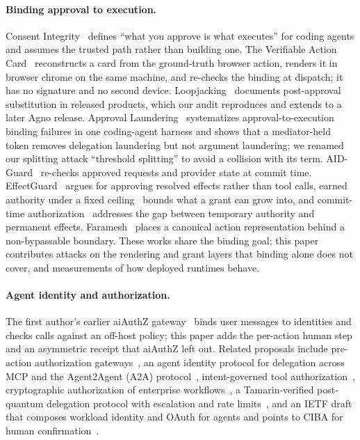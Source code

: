 \paragraph{Binding approval to execution.} Consent Integrity~\citep{weng2026consent} defines ``what you approve is
what executes'' for coding agents and assumes the trusted path rather than building one. The Verifiable Action
Card~\citep{irshad2026vac} reconstructs a card from the ground-truth browser action, renders it in browser chrome on
the same machine, and re-checks the binding at dispatch; it has no signature and no second device.
Loopjacking~\citep{arunkumar2026loopjacking} documents post-approval substitution in released products, which our
audit reproduces and extends to a later Agno release. Approval
Laundering~\citep{wang2026laundering} systematizes approval-to-execution binding failures in one coding-agent harness
and shows that a mediator-held token removes delegation laundering but not argument laundering; we renamed our
splitting attack ``threshold splitting'' to avoid a collision with its term. AID-Guard~\citep{tong2026aidguard}
re-checks approved requests and provider state at commit time. EffectGuard~\citep{zhang2026effectguard} argues
for approving resolved effects rather than tool calls, earned authority under a fixed ceiling~\citep{zhang2026earned}
bounds what a grant can grow into, and commit-time authorization~\citep{santosgrueiro2026commit} addresses the gap
between temporary authority and permanent effects. Faramesh~\citep{fatmi2026faramesh} places a canonical action representation behind a
non-bypassable boundary. These works share the binding goal; this paper contributes attacks on the rendering and
grant layers that binding alone does not cover, and measurements of how deployed runtimes behave.

\paragraph{Agent identity and authorization.} The first author's earlier aiAuthZ gateway~\citep{kodathala2026aiauthz} binds user
messages to identities and checks calls against an off-host policy; this paper adds the per-action human step and
an asymmetric receipt that aiAuthZ left out. Related proposals include pre-action authorization
gateways~\citep{uchibeke2026preaction}, an agent identity protocol for delegation across MCP and the Agent2Agent (A2A)
protocol~\citep{prakash2026aip}, intent-governed tool authorization~\citep{zhu2026intent}, cryptographic authorization of
enterprise workflows~\citep{weng2026neural,llambimorillas2026cva}, a Tamarin-verified post-quantum delegation protocol
with escalation and rate limits~\citep{chen2026aith}, and an IETF draft that composes workload identity and OAuth for
agents and points to CIBA for human confirmation~\citep{ietf2026klrc}.

